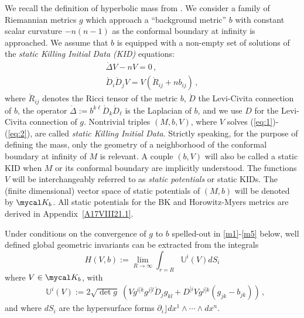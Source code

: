 \documentclass[a4paper,10pt]{article}
\newcommand{\cNb}{\red{\mycal K_b}}
\newcommand{\Ricb}{\red{\mathring{R}}}
\newcommand{\red}[1]{{\color{red}#1}}
\newcommand{\zD}{\mathring{D}}%
\newcommand{\ourU}{\mathbb U}%
\newcommand{\nn}{\nonumber}
\newcommand{\be}{\begin{equation}}
\newcommand{\ee}{\end{equation}}
\newcommand{\eq}[1]{(\ref{#1})}
\renewcommand{\red}[1]{#1}%
\begin{document}
     We recall the definition of hyperbolic mass from \cite{ChHerzlich}. We
     consider a family of Riemannian metrics $g$ which approach a ``background
         metric'' $b$ with constant scalar curvature  $-n(n-1)$ as the conformal boundary at infinity is approached.
         We assume
     that $b$ is equipped with a non-empty set of solutions of the \emph{static Killing Initial Data (KID)}
     equations:
     \begin{eqnarray}
      &  \label{eq:1}
       \red{\mathring \Delta}  V -nV =0\,,
      &
     \\
      &
       \label{eq:2} \zD_i\zD_j V = V( \Ricb_{ij} + n
     b_{ij})
      \,,
      &
     \end{eqnarray}
     where   $\Ricb_{ij}$ denotes the Ricci tensor of the
     metric $b$, $\zD$ the Levi-Civita connection of $b$, the operator
     $\red{\mathring \Delta} :=b^{k\ell}\zD_k\zD_\ell $ is the Laplacian of $b$, and we use $D$ for the Levi-Civita connection of $g$. Nontrivial
     triples $(M,b,V)$, where $V$ solves \eq{eq:1}-\eq{eq:2}, are called
     \emph{static Killing Initial Data}.
     Strictly speaking, for the purpose of defining the mass, only the geometry of a neighborhood of the conformal boundary at infinity of  $M$ is relevant. A couple $(b,V)$ will also be called a static KID when $M$ or its  conformal boundary are implicitly understood.
     The functions $V$ will be
     interchangeably referred to as \emph{static potentials} or  static KIDs.
     The (finite dimensional) vector space of static
     potentials of $(M,b)$ will be denoted by $\cNb$.
     All static potentials for the BK  and Horowitz-Myers metrics  are derived in Appendix~\ref{A17VIII21.1}.

     Under conditions on the convergence of $g$ to $b$ spelled-out in \eqref{m1}-\eqref{m5} below, well defined
     global geometric invariants can be extracted from the integrals~\cite{ChHerzlich}
      \be \label{mi12I}
     H(V,b):=\lim_{R\to\infty} \int_{r=R} \ourU^i(V) \red{dS}_i \ee
     where $V\in
     \cNb$, with
     \begin{eqnarray} \label{eq:3.312I} & {}\ourU^i (V):=  2\sqrt{\det
     g}\;\left(Vg^{i[k} g^{j]l} \zD_j g_{kl}
     +D^{[i}V %
     g^{j]k} (g_{jk}-b_{jk})\right)
     \,,
     \end{eqnarray}
     and
     where $dS_i$ are the hypersurface  forms $\partial_i\rfloor dx^1\wedge \cdots \wedge dx^n$.
\end{document}
